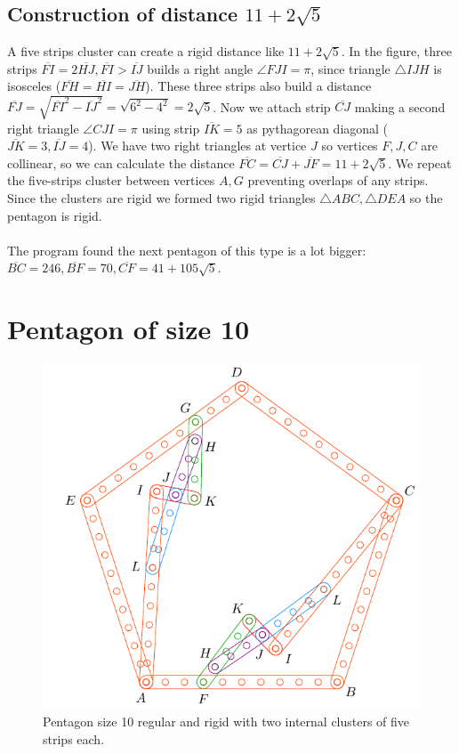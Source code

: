 \documentclass[11pt]{article}
\begin{document}
\subsection{Construction of distance $11+2\sqrt{5}$}

A five strips cluster can create a rigid distance like $11 + 2\sqrt{5}$. In the figure, three strips $\overline{FI} = 2\overline{HJ}, \overline{FI} > \overline{IJ}$ builds a right angle $\angle{FJI} = \pi$, since triangle $\triangle{IJH}$ is isosceles ($\overline{FH} = \overline{HI} = \overline{JH}$). These three strips also build a distance $\overline{FJ} = \sqrt{\overline{FI}^2 - \overline{IJ}^2} = \sqrt{6^2 - 4^2} = 2\sqrt5$. Now we attach strip $\overline{CJ}$ making a second right triangle $\angle{CJI} = \pi$ using strip $\overline{IK}=5$ as pythagorean diagonal ($\overline{JK}=3, \overline{IJ}=4$). We have two right triangles at vertice $J$ so vertices $F,J,C$ are collinear, so we can calculate the distance $\overline{FC} = \overline{CJ} + \overline{JF} = 11 + 2\sqrt5$. We repeat the five-strips cluster between vertices $A,G$ preventing overlaps of any strips. Since the clusters are rigid we formed two rigid triangles $\triangle{ABC}, \triangle{DEA}$ so the pentagon is rigid.
\\\\
The program found the next pentagon of this type is a lot bigger: $\overline{BC}=246, \overline{BF}=70, \overline{CF}=41+105\sqrt5$.

\section{Pentagon of size 10}

\begin{figure}[h]
 \centering
 \includegraphics[scale=1]{10/penta10a}
 \caption{Pentagon size 10 regular and rigid with two internal clusters of five strips each.}
 \label{fig:penta10a}
\end{figure}
\end{document}
